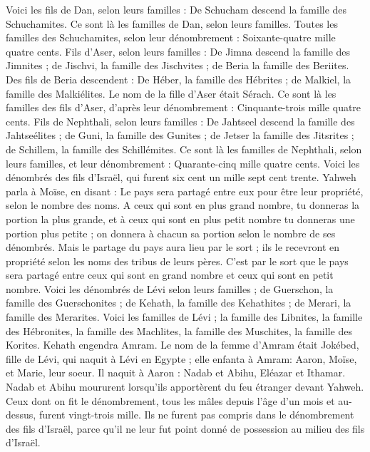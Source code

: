 \begin{multicols}{2}
Voici les fils de Dan, selon leurs familles : De Schucham descend la famille des Schuchamites. Ce sont là les familles de Dan, selon leurs familles.
Toutes les familles des Schuchamites, selon leur dénombrement : Soixante-quatre mille quatre cents.
Fils d'Aser, selon leurs familles : De Jimna descend la famille des Jimnites ; de Jischvi, la famille des Jischvites ; de Beria la famille des Beriites.
Des fils de Beria descendent : De Héber, la famille des Hébrites ; de Malkiel, la famille des Malkiélites.
Le nom de la fille d'Aser était Sérach.
Ce sont là les familles des fils d'Aser, d’après leur dénombrement : Cinquante-trois mille quatre cents.
Fils de Nephthali, selon leurs familles : De Jahtseel descend la famille des Jahtseélites ; de Guni, la famille des Gunites ;
de Jetser la famille des Jitsrites ; de Schillem, la famille des Schillémites.
Ce sont là les familles de Nephthali, selon leurs familles, et leur dénombrement : Quarante-cinq mille quatre cents.
Voici les dénombrés des fils d'Israël, qui furent six cent un mille sept cent trente.
Yahweh parla à Moïse, en disant :
Le pays sera partagé entre eux pour être leur propriété, selon le nombre des noms.
A ceux qui sont en plus grand nombre, tu donneras la portion la plus grande, et à ceux qui sont en plus petit nombre tu donneras une portion plus petite ; on donnera à chacun sa portion selon le nombre de ses dénombrés.
Mais le partage du pays aura lieu par le sort ; ils le recevront en propriété selon les noms des tribus de leurs pères.
C’est par le sort que le pays sera partagé entre ceux qui sont en grand nombre et ceux qui sont en petit nombre.
Voici les dénombrés de Lévi selon leurs familles ; de Guerschon, la famille des Guerschonites ; de Kehath, la famille des Kehathites ; de Merari, la famille des Merarites.
Voici les familles de Lévi ; la famille des Libnites, la famille des Hébronites, la famille des Machlites, la famille des Muschites, la famille des Korites. Kehath engendra Amram.
Le nom de la femme d’Amram était Jokébed, fille de Lévi, qui naquit à Lévi en Egypte ; elle enfanta à Amram: Aaron, Moïse, et Marie, leur soeur.
Il naquit à Aaron : Nadab et Abihu, Eléazar et Ithamar.
Nadab et Abihu moururent lorsqu’ils apportèrent du feu étranger devant Yahweh.
Ceux dont on fit le dénombrement, tous les mâles depuis l’âge d’un mois et au-dessus, furent vingt-trois mille. Ils ne furent pas compris dans le dénombrement des fils d’Israël, parce qu’il ne leur fut point donné de possession au milieu des fils d’Israël.

\end{multicols}

